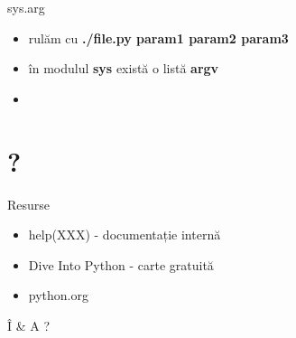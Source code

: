 \documentclass{beamer}
\begin{document}
\begin{frame}{sys.arg}
  \begin{itemize}
  \item rulăm cu \textbf{./file.py param1 param2 param3}
  \item în modulul \textbf{sys} există o listă \textbf{argv}
  \item \small 
  \end{itemize}
\end{frame}




\section{?}
\frame{\tableofcontents[currentsection]}

\begin{frame}{Resurse}
  \begin{itemize}
  \item help(XXX) - documentație internă
  \item Dive Into Python - carte gratuită
  \item python.org
  \end{itemize}
\end{frame}

\begin{frame}{Î \& A}
  ?
\end{frame}
\end{document}

